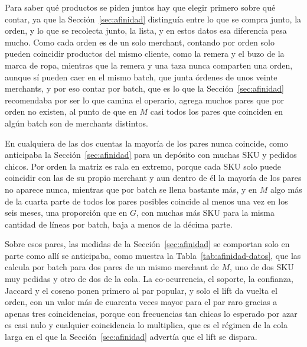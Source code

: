 Para saber qué productos se piden juntos hay que elegir primero sobre qué contar, ya que la Sección~\ref{sec:afinidad} distinguía entre lo que se compra junto, la orden, y lo que se recolecta junto, la lista, y en estos datos esa diferencia pesa mucho.
Como cada orden es de un solo merchant, contando por orden solo pueden coincidir productos del mismo cliente, como la remera y el buzo de la marca de ropa, mientras que la remera y una taza nunca comparten una orden, aunque sí pueden caer en el mismo batch, que junta órdenes de unos veinte merchants, y por eso contar por batch, que es lo que la Sección~\ref{sec:afinidad} recomendaba por ser lo que camina el operario, agrega muchos pares que por orden no existen, al punto de que en $M$ casi todos los pares que coinciden en algún batch son de merchants distintos.

En cualquiera de las dos cuentas la mayoría de los pares nunca coincide, como anticipaba la Sección~\ref{sec:afinidad} para un depósito con muchas SKU y pedidos chicos.
Por orden la matriz es rala en extremo, porque cada SKU solo puede coincidir con las de su propio merchant y aun dentro de él la mayoría de los pares no aparece nunca, mientras que por batch se llena bastante más, y en $M$ algo más de la cuarta parte de todos los pares posibles coincide al menos una vez en los seis meses, una proporción que en $G$, con muchas más SKU para la misma cantidad de líneas por batch, baja a menos de la décima parte.

Sobre esos pares, las medidas de la Sección~\ref{sec:afinidad} se comportan solo en parte como allí se anticipaba, como muestra la Tabla~\ref{tab:afinidad-datos}, que las calcula por batch para dos pares de un mismo merchant de $M$, uno de dos SKU muy pedidas y otro de dos de la cola.
La co-ocurrencia, el soporte, la confianza, Jaccard y el coseno ponen primero al par popular, y solo el lift da vuelta el orden, con un valor más de cuarenta veces mayor para el par raro gracias a apenas tres coincidencias, porque con frecuencias tan chicas lo esperado por azar es casi nulo y cualquier coincidencia lo multiplica, que es el régimen de la cola larga en el que la Sección~\ref{sec:afinidad} advertía que el lift se dispara.

